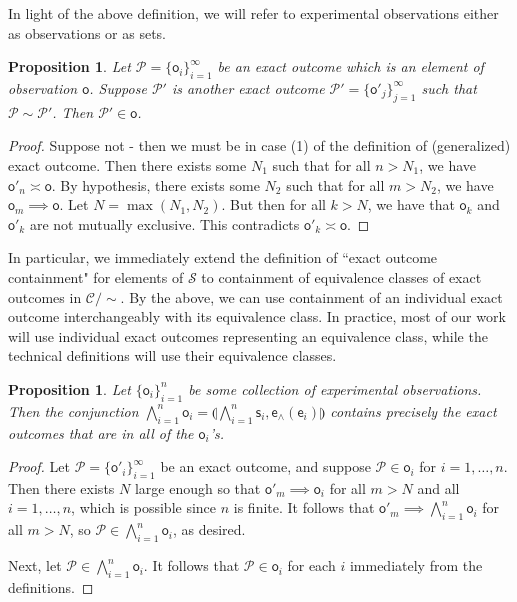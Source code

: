 \documentclass[review]{elsarticle}
\theoremstyle{plain}%
\newtheorem{prop}[thm]{Proposition}
\theoremstyle{definition}
\theoremstyle{remark}
\begin{document}
In light of the above definition, we will refer to experimental observations either as observations or as sets. 

\begin{prop}
Let $\mathcal{P}=\{\mathsf{o}_i\}_{i=1}^{\infty}$ be an exact outcome which is an element of observation $\mathsf{o}$. Suppose $\mathcal{P}'$ is another exact outcome $\mathcal{P}'=\{\mathsf{o}'_j\}_{j=1}^{\infty}$ such that $\mathcal{P}\sim\mathcal{P}'$. Then $\mathcal{P}'\in\mathsf{o}$. 
\end{prop}
\begin{proof}
Suppose not - then we must be in case (1) of the definition of (generalized) exact outcome. Then there exists some $N_1$ such that for all $n>N_1$, we have $\mathsf{o}'_n\asymp\mathsf{o}$. By hypothesis, there exists some $N_2$ such that for all $m>N_2$, we have $\mathsf{o}_m\implies\mathsf{o}$. Let $N=\max(N_1,N_2)$. But then for all $k>N$, we have that $\mathsf{o}_k$ and $\mathsf{o}'_k$ are not mutually exclusive. This contradicts $\mathsf{o}'_k\asymp\mathsf{o}$. 
\end{proof}

In particular, we immediately extend the definition of ``exact outcome containment" for elements of $\mathcal{S}$ to containment of equivalence classes of exact outcomes in $\mathcal{C}/\sim$. By the above, we can use containment of an individual exact outcome interchangeably with its equivalence class. In practice, most of our work will use individual exact outcomes representing an equivalence class, while the technical definitions will use their equivalence classes.

\begin{prop}
Let $\{\mathsf{o}_i\}_{i=1}^{n}$ be some collection of experimental observations. Then the conjunction $\bigwedge\limits_{i=1}^{n} \mathsf{o}_i = \llparenthesis\bigwedge\limits_{i=1}^{n} \mathsf{s}_i, \mathsf{e}_{\wedge}(\mathsf{e}_i)\rrparenthesis$ contains precisely the exact outcomes that are in all of the $\mathsf{o}_i$'s. 
\end{prop}
\begin{proof}
Let $\mathcal{P} = \{\mathsf{o}'_i\}_{i=1}^{\infty}$ be an exact outcome, and suppose $\mathcal{P}\in\mathsf{o}_i$ for $i=1,\ldots,n$. Then there exists $N$ large enough so that $\mathsf{o}'_m\implies\mathsf{o}_i$ for all $m>N$ and all $i=1,\ldots,n$, which is possible since $n$ is finite. It follows that $\mathsf{o}'_m\implies\bigwedge\limits_{i=1}^{n} \mathsf{o}_i$ for all $m>N$, so $\mathcal{P}\in\bigwedge\limits_{i=1}^{n} \mathsf{o}_i$, as desired. 

Next, let $\mathcal{P}\in\bigwedge\limits_{i=1}^{n} \mathsf{o}_i$. It follows that $\mathcal{P}\in\mathsf{o}_i$ for each $i$ immediately from the definitions. 
\end{proof}
\end{document}

